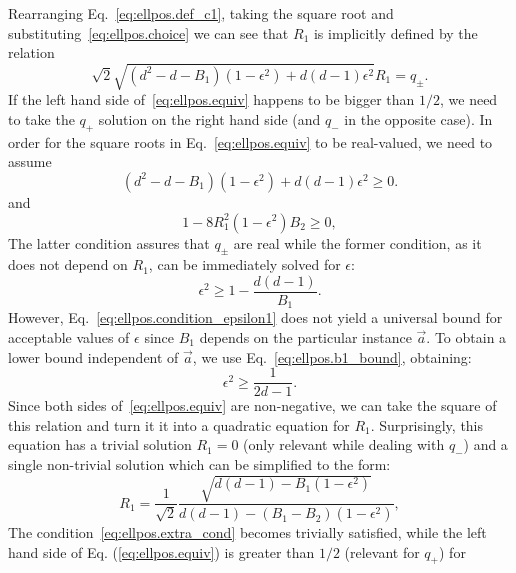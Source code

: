 Rearranging Eq.~\eqref{eq:ellpos.def_c1}, taking the square root and substituting~\eqref{eq:ellpos.choice} we can see that $R_1$ is implicitly defined by the relation
\begin{equation}
  \sqrt{2}\sqrt{\left(d^{2}-d-B_1\right)\left(1-\epsilon^{2}\right)+d\left(d-1\right)\epsilon^{2}}R_{1}=q_\pm.
  \label{eq:ellpos.equiv}
\end{equation}
If the left hand side of~\eqref{eq:ellpos.equiv} happens to be bigger than $1/2$, we need to take the $q_+$ solution on the right hand side (and $q_-$ in the opposite case). In order for the square roots in Eq.~\eqref{eq:ellpos.equiv} to be real-valued, we need to assume
\begin{equation}
  \left(d^{2}-d-B_1\right)\left(1-\epsilon^{2}\right)+d\left(d-1\right)\epsilon^{2}\geq0.
\end{equation}
and
\begin{equation}
  1-8R_{1}^{2}\left(1-\epsilon^{2}\right)B_{2}\geq0,\label{eq:ellpos.extra_cond}
\end{equation}
The latter condition assures that $q_\pm$ are real while the former condition, as it
does not depend on $R_{1}$, can be immediately solved for $\epsilon$:
\begin{equation}
  \epsilon^{2}\geq1-\frac{d\left(d-1\right)}{B_{1}}.
  \label{eq:ellpos.condition_epsilon1}
\end{equation}
However, Eq.~\eqref{eq:ellpos.condition_epsilon1} does not yield a universal bound for acceptable values of $\epsilon$ since $B_1$ depends on the particular instance $\vec a$.
To obtain a lower bound independent of $\vec a$, we use Eq.~\eqref{eq:ellpos.b1_bound}, obtaining:
\begin{equation}
\epsilon^2 \geq \frac{1}{2d - 1}.
\end{equation}
Since both sides of~\eqref{eq:ellpos.equiv} are non-negative, we can take the square of this relation and turn it it into a quadratic equation for $R_1$. Surprisingly, this equation has a trivial solution $R_1=0$ (only relevant while dealing with $q_-$) and a single  non-trivial solution which can be simplified to the form:
\begin{equation}
  R_{1}=\frac{1}{\sqrt{2}}\frac{\sqrt{d\left(d-1\right)-B_{1}\left(1-\epsilon^{2}\right)}}{d\left(d-1\right)-\left(B_{1}-B_{2}\right)\left(1-\epsilon^{2}\right)},
  \label{eq:ellpos_r1}
\end{equation}
The condition~\eqref{eq:ellpos.extra_cond} becomes trivially satisfied, while the left hand side of Eq. (\ref{eq:ellpos.equiv}) is greater than $1/2$ (relevant for $q_+$) for

